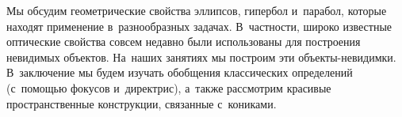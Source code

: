



Мы обсудим геометрические свойства эллипсов, гипербол и~парабол, которые
находят применение в~разнообразных задачах.
В~частности, широко известные оптические свойства совсем недавно были
использованы для построения невидимых объектов.
На~наших занятиях мы построим эти объекты-невидимки.
В~заключение мы будем изучать обобщения классических определений (с~помощью
фокусов и~директрис), а~также рассмотрим красивые пространственные конструкции,
связанные с~кониками.

